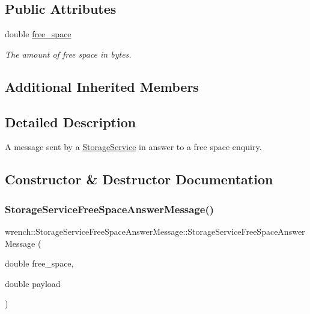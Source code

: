 \subsection*{Public Attributes}
\begin{DoxyCompactItemize}
\item 
\mbox{\label{classwrench_1_1_storage_service_free_space_answer_message_a99963ea611b243cb0a31cf01998e75da}} 
double \hyperlink{classwrench_1_1_storage_service_free_space_answer_message_a99963ea611b243cb0a31cf01998e75da}{free\+\_\+space}
\begin{DoxyCompactList}\small\item\em The amount of free space in bytes. \end{DoxyCompactList}\end{DoxyCompactItemize}
\subsection*{Additional Inherited Members}


\subsection{Detailed Description}
A message sent by a \hyperlink{classwrench_1_1_storage_service}{Storage\+Service} in answer to a free space enquiry. 

\subsection{Constructor \& Destructor Documentation}
\mbox{\label{classwrench_1_1_storage_service_free_space_answer_message_a854b146de134b69b17904ae3b13deaf4}} 
\subsubsection{\texorpdfstring{Storage\+Service\+Free\+Space\+Answer\+Message()}{StorageServiceFreeSpaceAnswerMessage()}}
{\footnotesize\ttfamily wrench\+::\+Storage\+Service\+Free\+Space\+Answer\+Message\+::\+Storage\+Service\+Free\+Space\+Answer\+Message (\begin{DoxyParamCaption}\item[{double}]{free\+\_\+space,  }\item[{double}]{payload }\end{DoxyParamCaption})}



